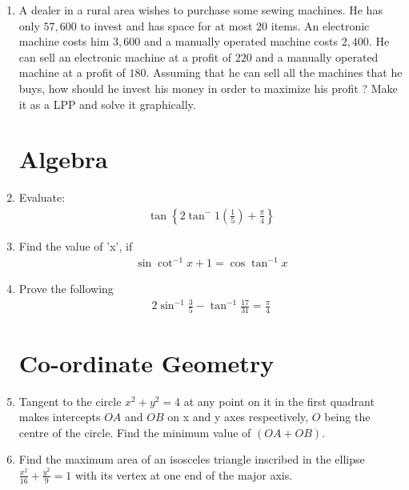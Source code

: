 \documentclass[12pt,-letter paper]{article}
\providecommand{\cbrak}[1]{\ensuremath{\left\{#1\right\}}}
\providecommand{\brak}[1]{\ensuremath{\left(#1\right)}}
\providecommand{\brak}[1]{\ensuremath{\left(#1\right)}}
\begin{document}
\begin{enumerate}
 
    \item A dealer in a rural area wishes to purchase some sewing machines. He has only  \rupee $57,600$ to invest and has space for at most $20$ items. An electronic machine costs him \rupee $3,600$ and a manually operated machine costs \rupee $2,400$. He can sell an electronic machine at a profit of $220$ and a manually operated machine at a profit of \rupee $180$. Assuming that he can sell all the machines that he buys, how should he invest his money in order to maximize his profit ? Make it as a LPP and solve it graphically.	

\section{Algebra}
	\item Evaluate:
    \begin{align*}
        \tan\cbrak{2\tan^-1{\brak{\frac{1}{5}}}+\frac{\pi}{4}}
    \end{align*}

	\item Find the value of 'x', if
 \begin{align*}
     \sin{\cot^{-1}{x+1}} = \cos{\tan^{-1}{x}}
 \end{align*}
 
	\item Prove the following
	\begin{align*}
		2\sin^{-1}{\frac{3}{5}}-\tan^{-1}{\frac{17}{31}} = \frac{\pi}{4}
	\end{align*}

\section{Co-ordinate Geometry}
    \item Tangent to the circle $x^2 + y^2 = 4$ at any point on it in the first quadrant makes intercepts $OA$ and $OB$ on x and y axes respectively, $O$ being the centre of the circle. Find the minimum value of $(OA + OB)$.
    \item Find the maximum area of an isosceles triangle inscribed in the ellipse $\frac{x^2}{16}+\frac{y^2}{9} = 1$ with its vertex at one end of the major axis.
\end{enumerate}
\end{document}
